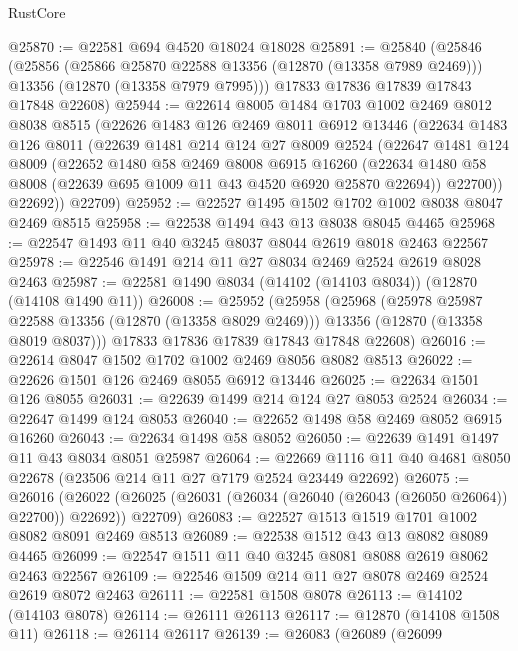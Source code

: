 \begin{lexlean}{RustCore}
\begin{coremodule}
@25870 := @22581 @694 @4520 @18024 @18028
@25891 := @25840
    (@25846
      (@25856
        (@25866 @25870 @22588 @13356 (@12870 (@13358 @7989 @2469)))
        @13356
        (@12870 (@13358 @7979 @7995)))
      @17833
      @17836
      @17839
      @17843
      @17848
      @22608)
@25944 := @22614
    @8005
    @1484
    @1703
    @1002
    @2469
    @8012
    @8038
    @8515
    (@22626
      @1483
      @126
      @2469
      @8011
      @6912
      @13446
      (@22634
        @1483
        @126
        @8011
        (@22639
          @1481
          @214
          @124
          @27
          @8009
          @2524
          (@22647
            @1481
            @124
            @8009
            (@22652
              @1480
              @58
              @2469
              @8008
              @6915
              @16260
              (@22634 @1480 @58 @8008 (@22639 @695 @1009 @11 @43 @4520 @6920 @25870 @22694))
              @22700))
          @22692))
      @22709)
@25952 := @22527 @1495 @1502 @1702 @1002 @8038 @8047 @2469 @8515
@25958 := @22538 @1494 @43 @13 @8038 @8045 @4465
@25968 := @22547 @1493 @11 @40 @3245 @8037 @8044 @2619 @8018 @2463 @22567
@25978 := @22546 @1491 @214 @11 @27 @8034 @2469 @2524 @2619 @8028 @2463
@25987 := @22581 @1490 @8034 (@14102 (@14103 @8034)) (@12870 (@14108 @1490 @11))
@26008 := @25952
    (@25958
      (@25968
        (@25978 @25987 @22588 @13356 (@12870 (@13358 @8029 @2469)))
        @13356
        (@12870 (@13358 @8019 @8037)))
      @17833
      @17836
      @17839
      @17843
      @17848
      @22608)
@26016 := @22614 @8047 @1502 @1702 @1002 @2469 @8056 @8082 @8513
@26022 := @22626 @1501 @126 @2469 @8055 @6912 @13446
@26025 := @22634 @1501 @126 @8055
@26031 := @22639 @1499 @214 @124 @27 @8053 @2524
@26034 := @22647 @1499 @124 @8053
@26040 := @22652 @1498 @58 @2469 @8052 @6915 @16260
@26043 := @22634 @1498 @58 @8052
@26050 := @22639 @1491 @1497 @11 @43 @8034 @8051 @25987
@26064 := @22669 @1116 @11 @40 @4681 @8050 @22678 (@23506 @214 @11 @27 @7179 @2524 @23449 @22692)
@26075 := @26016
    (@26022 (@26025 (@26031 (@26034 (@26040 (@26043 (@26050 @26064)) @22700)) @22692)) @22709)
@26083 := @22527 @1513 @1519 @1701 @1002 @8082 @8091 @2469 @8513
@26089 := @22538 @1512 @43 @13 @8082 @8089 @4465
@26099 := @22547 @1511 @11 @40 @3245 @8081 @8088 @2619 @8062 @2463 @22567
@26109 := @22546 @1509 @214 @11 @27 @8078 @2469 @2524 @2619 @8072 @2463
@26111 := @22581 @1508 @8078
@26113 := @14102 (@14103 @8078)
@26114 := @26111 @26113
@26117 := @12870 (@14108 @1508 @11)
@26118 := @26114 @26117
@26139 := @26083
    (@26089
      (@26099

\end{coremodule}
\end{lexlean}

